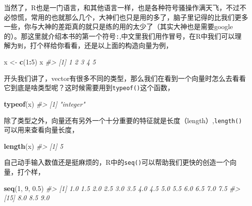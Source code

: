 \documentclass[
]{book}
\newenvironment{Shaded}{\begin{snugshade}}{\end{snugshade}}
\newcommand{\CommentTok}[1]{\textcolor[rgb]{0.56,0.35,0.01}{\textit{#1}}}
\newcommand{\DecValTok}[1]{\textcolor[rgb]{0.00,0.00,0.81}{#1}}
\newcommand{\FloatTok}[1]{\textcolor[rgb]{0.00,0.00,0.81}{#1}}
\newcommand{\FunctionTok}[1]{\textcolor[rgb]{0.13,0.29,0.53}{\textbf{#1}}}
\newcommand{\NormalTok}[1]{#1}
\newcommand{\OtherTok}[1]{\textcolor[rgb]{0.56,0.35,0.01}{#1}}
\newcommand{\SpecialCharTok}[1]{\textcolor[rgb]{0.81,0.36,0.00}{\textbf{#1}}}
\begin{document}
当然了，R也是一门语言，和其他语言一样，也是各种符号骚操作满天飞，不过不必惊慌，常用的也就那么几个，大神们也只是用的多了，脑子里记得的比我们更多一些，你与大神的差距真的就只是练的用的太少了（其实大神也是需要google的）。那这里就介绍本书的第一个符号\texttt{:},中文里我们用作冒号，在R中我们可以理解为\texttt{到}，打个样给你看看，还是以上面的构造向量为例，

\begin{Shaded}
\begin{Highlighting}[]
\NormalTok{x }\OtherTok{\textless{}{-}} \FunctionTok{c}\NormalTok{(}\DecValTok{1}\SpecialCharTok{:}\DecValTok{5}\NormalTok{)}
\NormalTok{x}
\CommentTok{\#\textgreater{} [1] 1 2 3 4 5}
\end{Highlighting}
\end{Shaded}

开头我们讲了，vector有很多不同的类型，那么我们在看到一个向量时怎么去看看它到底是啥类型呢？这时候需要用到\texttt{typeof()}这个函数，

\begin{Shaded}
\begin{Highlighting}[]
\FunctionTok{typeof}\NormalTok{(x)}
\CommentTok{\#\textgreater{} [1] "integer"}
\end{Highlighting}
\end{Shaded}

除了类型之外，向量还有另外一个十分重要的特征就是长度（length）,\texttt{length()}可以用来查看向量长度，

\begin{Shaded}
\begin{Highlighting}[]
\FunctionTok{length}\NormalTok{(x)}
\CommentTok{\#\textgreater{} [1] 5}
\end{Highlighting}
\end{Shaded}

自己动手输入数值还是挺麻烦的，R中的\texttt{seq()}可以帮助我们更快的创造一个向量，打个样，

\begin{Shaded}
\begin{Highlighting}[]
\FunctionTok{seq}\NormalTok{(}\DecValTok{1}\NormalTok{, }\DecValTok{9}\NormalTok{, }\FloatTok{0.5}\NormalTok{)}
\CommentTok{\#\textgreater{}  [1] 1.0 1.5 2.0 2.5 3.0 3.5 4.0 4.5 5.0 5.5 6.0 6.5 7.0 7.5}
\CommentTok{\#\textgreater{} [15] 8.0 8.5 9.0}
\end{Highlighting}
\end{Shaded}
\end{document}
